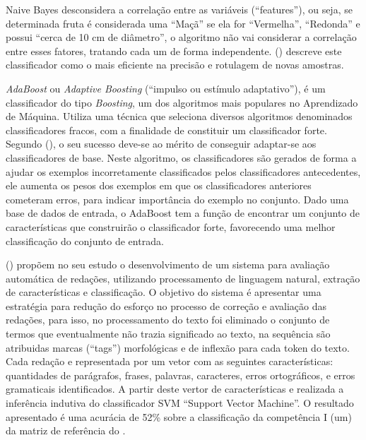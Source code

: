 \noindent Naive Bayes desconsidera a correlação entre 
as variáveis (``features''), ou seja, se determinada fruta é considerada uma 
``Maçã'' se ela for ``Vermelha'', ``Redonda'' e possui ``cerca de 10 cm 
de diâmetro'', o algoritmo não vai considerar a correlação entre esses fatores, 
tratando cada um de forma independente. 
 (\citeyear{chakrabarti2002mining}) 
descreve este classificador como o mais eficiente na precisão e rotulagem de 
novas amostras. 

\textit{AdaBoost} ou \textit{Adaptive Boosting} (``impulso ou estímulo 
adaptativo''), é um classificador do tipo \textit{Boosting}, um dos algoritmos 
mais populares no Aprendizado de Máquina. Utiliza uma técnica que seleciona 
diversos algoritmos denominados classificadores fracos, com a finalidade de 
constituir um classificador forte. Segundo  
(\citeyear{dos2015detecccao}), o seu sucesso deve-se ao mérito de conseguir 
adaptar-se aos classificadores de base. Neste algoritmo, os classificadores são 
gerados de forma a ajudar os exemplos incorretamente classificados pelos 
classificadores antecedentes, ele aumenta os pesos dos exemplos em que os 
classificadores anteriores cometeram erros, para indicar importância do exemplo 
no conjunto. Dado uma base de dados de entrada, o AdaBoost tem a função de 
encontrar um conjunto de características que construirão o classificador forte, 
favorecendo uma melhor classificação do conjunto de entrada.

 (\citeyear{junior2017proposta}) propõem 
no seu estudo o desenvolvimento de um sistema para avaliação automática de 
redações, utilizando processamento de linguagem natural, extração de 
características e classificação. O objetivo do sistema é apresentar uma 
estratégia para redução do esforço no processo de correção e avaliação das 
redações, para isso, no processamento do texto foi eliminado o conjunto de 
termos que eventualmente não trazia significado ao texto, na sequência são 
atribuidas marcas (``tags'') morfológicas e de inflexão para cada token do 
texto. Cada redação e representada por um vetor com as seguintes 
características: quantidades de parágrafos, frases, palavras, caracteres, erros 
ortográficos, e erros gramaticais identificados. A partir deste vertor de 
características e realizada a inferência indutiva do classificador SVM 
``Support Vector Machine''. O resultado apresentado é uma acurácia de 52\% 
sobre a classificação da competência I (um) da matriz de referência do 
\citeauthor{edital_enem:2016}.